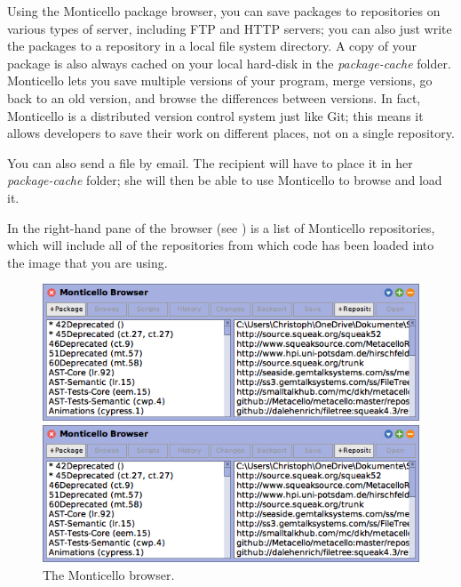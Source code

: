 \documentclass[a4paper,10pt,twoside]{book}
\begin{document}
Using the Monticello package browser, you can save packages to repositories on various types of server, including FTP and HTTP servers; you can also just write the packages to a repository in a local file system directory.
A copy of your package is also always cached on your local hard-disk in the \emph{package-cache} folder. 
Monticello lets you save multiple versions of your program, merge versions, go back to an old version, and browse the differences between versions. 
In fact, Monticello is a distributed version control system just like Git; this means it allows developers to save their work on different places, not on a single repository.

You can also send a  file by email. 
The recipient will have to place it in her \emph{package-cache} folder; she will then be able to use Monticello to browse and load it.

In the right-hand pane of the browser (see ) is a list of Monticello repositories, which will include all of the repositories from which code has been loaded into the image that you are using.  

\begin{figure}[hbt]
\ifluluelse
	{\centerline {\includegraphics[width=\textwidth]{MonticelloBrowser}}}
	{\centerline {\includegraphics[scale=0.7]{MonticelloBrowser}}}
\caption{The Monticello browser.
\label{fig:monticello1}}
\end{figure}
\end{document}
